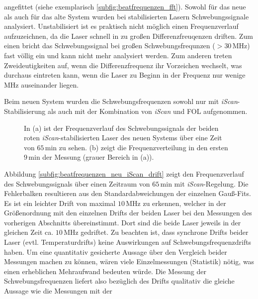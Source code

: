 angefittet (siehe exemplarisch \ref{subfig:beatfrequenzen_fft}).
Sowohl für das neue als auch für das alte System wurden bei stabilisierten
Lasern Schwebungssignale analysiert. Unstabilisiert ist es praktisch nicht
möglich einen Frequenzverlauf aufzuzeichnen, da die Laser schnell in zu
großen Differenzfreuqenzen driften. Zum einen bricht das Schwebungssignal
bei großen Schwebungsfrequnzen ($>30\,$MHz) fast völlig ein und kann nicht mehr
analysiert werden. Zum anderen treten Zweideutigkeiten auf, wenn die
Differenzfrequenz ihr Vorzeichen wechselt, was durchaus eintreten kann, wenn die
Laser zu Beginn in der Frequenz nur wenige MHz auseinander liegen.\par
Beim neuen System wurden die Schwebungsfrequenzen sowohl nur mit
\textit{iScan}-Stabilisierung als auch mit der Kombination von \textit{iScan}
und FOL aufgenommen.
\begin{figure}[hp]
 	\centering
 	\footnotesize
 	\fbox{\parbox{\dimexpr \linewidth - 2\fboxrule - 2\fboxsep}{
 	\subfigure[]{
		\label{subfig:beatfrequenzen_neu_iScan_drift}
		
		}
 	\subfigure[]{
		\label{subfig:beatfrequenzen_neu_iScan_histogramm}
		
		}
	}}
	\caption[Beatfrequenzen - neues System mit \textit{iScan}]{In (a) ist der
	Frequenzverlauf des Schwebungssignals der beiden roten
	\textit{iScan}-stabilisierten Laser des neuen Systems über eine Zeit von
	$65\,$min zu sehen.
	(b) zeigt die Frequenzverteilung in den ersten $9\,$min der Messung (grauer Bereich in (a)).}
	\label{fig:beatfrequenzen_neu_iScan}
\end{figure}
Abbildung \ref{subfig:beatfrequenzen_neu_iScan_drift} zeigt den Frequenzverlauf
des Schwebungssignals über einen Zeitraum von $65\,$min mit
\textit{iScan}-Regelung. Die Fehlerbalken resultieren aus den
Standardabweichungen der einzelnen Gauß-Fits. Es ist ein leichter Drift von
maximal $10\,$MHz zu erkennen, welcher in der Größenordnung mit den
einzelnen Drifts der beiden Laser bei den Messungen des vorherigen Abschnitts
übereinstimmt. Dort sind die beide Laser jeweils in der gleichen Zeit ca.
$10\,$MHz gedriftet. Zu beachten ist, dass synchrone Drifts beider Laser (evtl.
Temperaturdrifts) keine Auswirkungen auf Schwebungsfrequenzdrifts haben. Um eine
quantitativ gesicherte Aussage über den Vergleich beider Messungen machen zu
können, wären viele Einzelmessungen (Statistik) nötig, was einen erheblichen
Mehraufwand bedeuten würde. Die Messung der Schwebungsfrequenzen liefert also
bezüglich des Drifts qualitativ die gleiche Aussage wie die Messungen mit der
